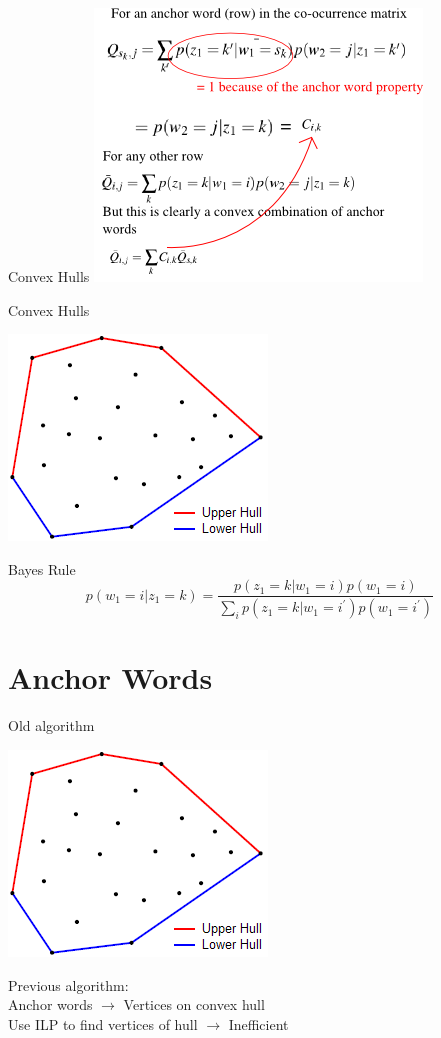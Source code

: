 \documentclass{lecture}
\begin{document}
\begin{plain}{Convex Hulls}
\includegraphics[scale=0.8]{figs/anchor_words}
\end{plain}

\begin{plain}{Convex Hulls}
\begin{center}\includegraphics[scale = 0.6]{figs/convex_hull}\end{center}
Bayes Rule
$$p(w_1 = i | z_1 = k) = \frac{p(z_1 = k | w_1 = i)p(w_1 = i)}{\sum_i p(z_1 = k | w_1 = i^\prime)p(w_1 = i^\prime)}$$
\end{plain}


\section[Anchor Words]{Anchor Words}

\begin{plain}{Old algorithm}
\begin{center}\includegraphics[scale = 0.6]{figs/convex_hull}\end{center}
Previous algorithm:\\
Anchor words $\rightarrow$ Vertices on convex hull\\
Use ILP to find vertices of hull $\rightarrow$ Inefficient
\end{plain}
\end{document}
